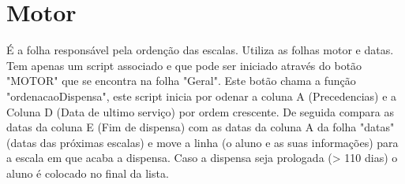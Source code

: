 \graphicspath{{Images/}}

\section{Motor}

É a folha responsável pela ordenção das escalas. Utiliza as folhas motor e datas. Tem apenas um script associado e que pode ser iniciado através do botão "MOTOR" que se encontra na folha "Geral". Este botão chama a função "ordenacaoDispensa", este script inicia por odenar a coluna A (Precedencias) e a Coluna D (Data de ultimo serviço) por ordem crescente. De seguida compara as datas da coluna E (Fim de dispensa) com as datas da coluna A da folha "datas" (datas das próximas escalas) e move a linha (o aluno e as suas informações) para a escala em que acaba a dispensa. Caso a dispensa seja prologada (> 110 dias) o aluno é colocado no final da lista.
